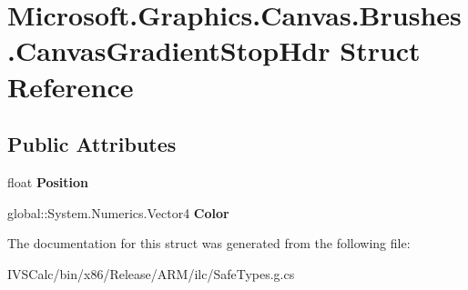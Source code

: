 \hypertarget{struct_microsoft_1_1_graphics_1_1_canvas_1_1_brushes_1_1_canvas_gradient_stop_hdr}{}\section{Microsoft.\+Graphics.\+Canvas.\+Brushes.\+Canvas\+Gradient\+Stop\+Hdr Struct Reference}
\label{struct_microsoft_1_1_graphics_1_1_canvas_1_1_brushes_1_1_canvas_gradient_stop_hdr}
\subsection*{Public Attributes}
\begin{DoxyCompactItemize}
\item 
\mbox{\label{struct_microsoft_1_1_graphics_1_1_canvas_1_1_brushes_1_1_canvas_gradient_stop_hdr_ab6362f926527b54fbfd09c8c3d6484e7}} 
float {\bfseries Position}
\item 
\mbox{\label{struct_microsoft_1_1_graphics_1_1_canvas_1_1_brushes_1_1_canvas_gradient_stop_hdr_af1865f7bc516ba2cdff56596dd89607f}} 
global\+::\+System.\+Numerics.\+Vector4 {\bfseries Color}
\end{DoxyCompactItemize}


The documentation for this struct was generated from the following file\+:\begin{DoxyCompactItemize}
\item 
I\+V\+S\+Calc/bin/x86/\+Release/\+A\+R\+M/ilc/Safe\+Types.\+g.\+cs\end{DoxyCompactItemize}
